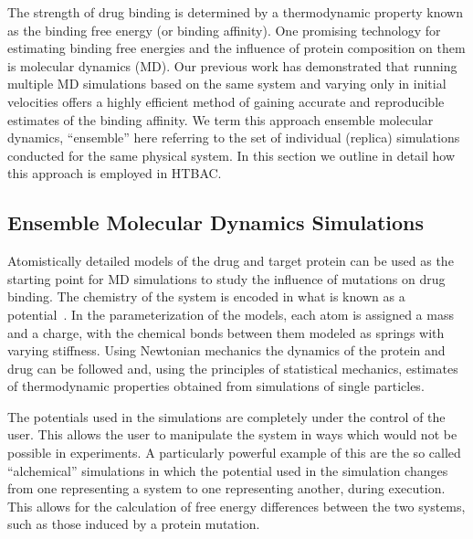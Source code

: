 
The strength of drug binding is determined by a thermodynamic property known
as the binding free energy (or binding affinity). One promising technology
for estimating binding free energies and the influence of protein composition
on them is molecular dynamics (MD). Our previous work \cite{Sadiq2010, Wan2011} has 
demonstrated that running multiple MD simulations based on the same system and varying 
only in initial velocities offers a highly efficient method of gaining accurate and 
reproducible estimates of the binding affinity. We term this approach ensemble 
molecular dynamics, ``ensemble'' here referring to the set of individual (replica) 
simulations conducted for the same physical system. In this section we outline in detail 
how this approach is employed in HTBAC.

\subsection{Ensemble Molecular Dynamics Simulations}

Atomistically detailed models of the drug and target protein can be used as the 
starting point for MD simulations to
study the influence of mutations on drug binding. The chemistry of the system
is encoded in what is known as a potential~\cite{Karplus2002}. In the
parameterization of the models, each atom is assigned a mass and a charge,
with the chemical bonds between them modeled as springs with varying
stiffness. Using Newtonian mechanics the dynamics of the protein and drug can
be followed and, using the principles of statistical mechanics, estimates of
thermodynamic properties obtained from simulations of single particles.

The potentials used in the simulations are completely under the control of
the user. This allows the user to manipulate the system in ways which would
not be possible in experiments. A particularly powerful example of this are
the so called ``alchemical'' simulations in which the potential used in the
simulation changes from one representing a system to one representing
another, during execution. This allows for the calculation of free energy
differences between the two systems, such as those induced by a protein
mutation.

